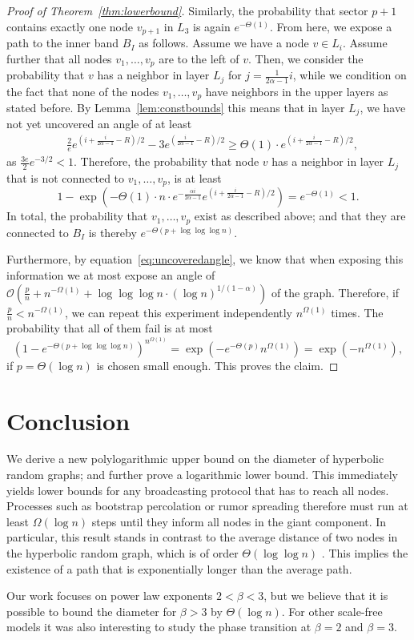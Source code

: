\documentclass{llncs}
\newcommand{\Oh}{\mathcal{O}}
\newcommand{\thmref}[1]{Theorem~\ref{thm:#1}}
\newcommand{\lemref}[1]{Lemma~\ref{lem:#1}}
\newcommand{\eq}[1]{equation~\eqref{eq:#1}}
\renewcommand{\geq}{\geqslant}
\begin{document}
\begin{proof}[Proof of \thmref{lowerbound}]
Similarly, the probability that sector $p+1$ contains exactly one node $v_{p+1}$ in $L_3$ is again $e^{-\Theta(1)}$. From here, we expose a path to the inner band $B_I$ as follows. Assume we have a node $v \in L_i$. Assume further that all nodes $v_1, \ldots, v_{p}$ are to the left of $v$. Then, we consider the probability that $v$ has a neighbor in layer $L_j$ for $j = \tfrac 1{2\alpha-1}i$, while we condition on the fact that none of the nodes $v_1, \ldots, v_p$ have neighbors in the upper layers as stated before. By \lemref{constbounds} this means that in layer $L_j$, we have not yet uncovered an angle of at least 
\begin{align*}
&\tfrac2e e^{(i+\frac i {2\alpha-1} -R)/2} - 3e^{(\frac i {2\alpha-1}-R)/2} 
\geq{} \Theta(1) \cdot e^{(i+\frac i {2\alpha-1} -R)/2},
\end{align*}
as $\tfrac {3e}2 e^{-3/2} < 1$. Therefore, the probability that node $v$ has a neighbor in layer $L_j$ that is not connected to $v_1, \ldots, v_p$, is at least
$$1 - \exp(- \Theta(1) \cdot n \cdot e^{-\frac{\alpha i}{2\alpha-1} } e^{(i+\frac i {2\alpha-1} -R)/2}) =  e^{-\Theta(1)} < 1.$$
In total, the probability that $v_1, \ldots, v_p$ exist as described above; and that they are connected to $B_I$ is thereby
$e^{-\Theta(p + \log\log\log n)}. $

Furthermore, by \eq{uncoveredangle}, we know that when exposing this information we at most expose an angle of $\Oh(\tfrac pn + n^{-\Omega(1)} + \log\log\log n \cdot (\log n)^{1/(1-\alpha)} )$ of the graph. 
Therefore, if $\tfrac pn < n^{-\Omega(1)}$, we can repeat this experiment independently $n^{\Omega(1)}$ times. The probability that all of them fail is at most
$$(1 - e^{-\Theta(p+\log\log\log n)})^{n^{\Omega(1)}} = \exp(- e^{-\Theta(p)} n^{\Omega(1)}) = \exp(- n^{\Omega(1)}),$$  
if $p=\Theta(\log n)$ is chosen small enough. This proves the claim.
\end{proof}


\section{Conclusion}
We derive a new polylogarithmic upper bound on the diameter of hyperbolic random graphs; and further prove a logarithmic lower bound. This  immediately yields lower bounds for any broadcasting protocol that has to reach all nodes. Processes such as bootstrap percolation or rumor spreading therefore must run at least $\Omega(\log n)$ steps until they inform all nodes in the giant component. In particular, this result stands in contrast to the average distance of two nodes in the hyperbolic random graph, which is of order $\Theta(\log \log n)$ \cite{bringmann2015geometric,abdullah2015typical}. This implies the existence of a path that is exponentially longer than the average path.

Our work focuses on power law exponents $2<\beta<3$, but we believe that it is possible to bound the diameter for $\beta>3$ by $\Theta(\log n)$. For other scale-free models it was also interesting to study the phase transition at $\beta=2$ and $\beta=3$.



\end{document}
